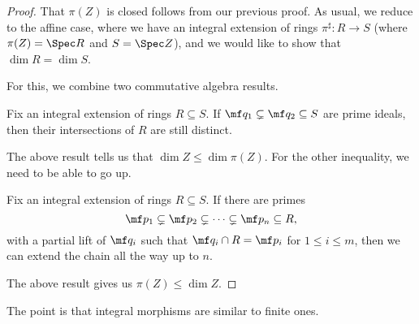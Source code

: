 \documentclass[../notes.tex]{subfiles}
\begin{document}
\begin{proof}
	That $\pi(Z)$ is closed follows from our previous proof. As usual, we reduce to the affine case, where we have an integral extension of rings $\pi^\sharp\colon R\to S$ (where $\pi(Z)=\Spec R$ and $S=\Spec Z$), and we would like to show that $\dim R=\dim S$.

	For this, we combine two commutative algebra results.
	\begin{lemma}
		Fix an integral extension of rings $R\subseteq S$. If $\mf q_1\subsetneq\mf q_2\subseteq S$ are prime ideals, then their intersections of $R$ are still distinct.
	\end{lemma}
	The above result tells us that $\dim Z\le\dim\pi(Z)$. For the other inequality, we need to be able to go up.
	\begin{lemma}[Going up]
		Fix an integral extension of rings $R\subseteq S$. If there are primes
		\[\mf p_1\subsetneq\mf p_2\subsetneq\cdots\subsetneq\mf p_n\subseteq R,\]
		with a partial lift of $\mf q_i$ such that $\mf q_i\cap R=\mf p_i$ for $1\le i\le m$, then we can extend the chain all the way up to $n$.
	\end{lemma}
	The above result gives us $\pi(Z)\le\dim Z$.
\end{proof}
The point is that integral morphisms are similar to finite ones.
\end{document}
